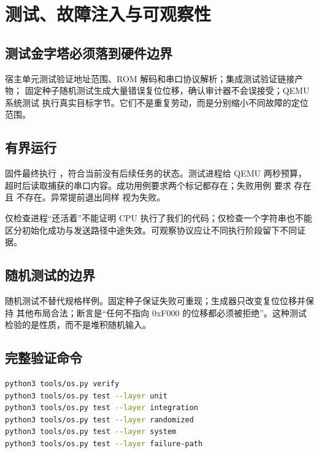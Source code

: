 \chapter{测试、故障注入与可观察性}

\section{测试金字塔必须落到硬件边界}

宿主单元测试验证地址范围、ROM 解码和串口协议解析；集成测试验证链接产物；
固定种子随机测试生成大量错误复位位移，确认审计器不会误接受；QEMU 系统测试
执行真实目标字节。它们不是重复劳动，而是分别缩小不同故障的定位范围。

\section{有界运行}

固件最终执行 ，符合当前没有后续任务的状态。测试进程给 QEMU
两秒预算，超时后读取捕获的串口内容。成功用例要求两个标记都存在；失败用例
要求  存在且  不存在。异常提前退出同样
视为失败。

\begin{failurebox}
仅检查进程“还活着”不能证明 CPU 执行了我们的代码；仅检查一个字符串也不能
区分初始化成功与发送路径中途失效。可观察协议应让不同执行阶段留下不同证据。
\end{failurebox}

\section{随机测试的边界}

随机测试不替代规格样例。固定种子保证失败可重现；生成器只改变复位位移并保持
其他布局合法；断言是“任何不指向 0xF000 的位移都必须被拒绝”。这种测试
检验的是性质，而不是堆积随机输入。

\section{完整验证命令}

\begin{lstlisting}[language=bash]
python3 tools/os.py verify
python3 tools/os.py test --layer unit
python3 tools/os.py test --layer integration
python3 tools/os.py test --layer randomized
python3 tools/os.py test --layer system
python3 tools/os.py test --layer failure-path
\end{lstlisting}

